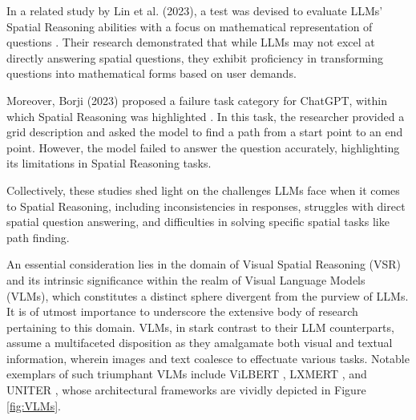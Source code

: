 \documentclass[journal,10pt]{IEEEtran}
\begin{document}
In a related study by Lin et al. (2023), a test was devised to evaluate LLMs' Spatial Reasoning abilities with a focus on mathematical representation of questions \cite{lin2023using}. Their research demonstrated that while LLMs may not excel at directly answering spatial questions, they exhibit proficiency in transforming questions into mathematical forms based on user demands.

Moreover, Borji (2023) proposed a failure task category for ChatGPT, within which Spatial Reasoning was highlighted \cite{borji2023categorical}. In this task, the researcher provided a grid description and asked the model to find a path from a start point to an end point. However, the model failed to answer the question accurately, highlighting its limitations in Spatial Reasoning tasks.

Collectively, these studies shed light on the challenges LLMs face when it comes to Spatial Reasoning, including inconsistencies in responses, struggles with direct spatial question answering, and difficulties in solving specific spatial tasks like path finding. 

An essential consideration lies in the domain of Visual Spatial Reasoning (VSR) and its intrinsic significance within the realm of Visual Language Models (VLMs), which constitutes a distinct sphere divergent from the purview of LLMs. It is of utmost importance to underscore the extensive body of research pertaining to this domain. VLMs, in stark contrast to their LLM counterparts, assume a multifaceted disposition as they amalgamate both visual and textual information, wherein images and text coalesce to effectuate various tasks. Notable exemplars of such triumphant VLMs include ViLBERT \cite{li2019visualbert}, LXMERT \cite{tan2019lxmert}, and UNITER \cite{chen2020uniter}, whose architectural frameworks are vividly depicted in Figure \ref{fig:VLMs}.
\end{document}

